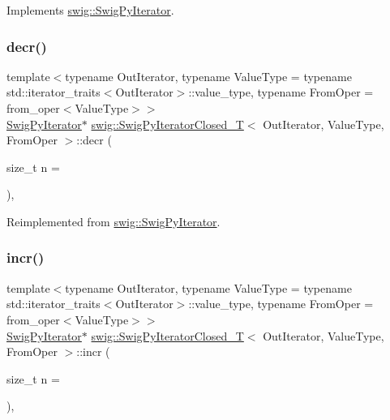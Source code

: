 Implements \hyperlink{structswig_1_1_swig_py_iterator_ae74c4b06f59975d9df19b30780cdefc1}{swig\+::\+Swig\+Py\+Iterator}.

\mbox{\label{classswig_1_1_swig_py_iterator_closed___t_aafae78acb63a1c4acaf2a76d4e9f6267}} 
\subsubsection{\texorpdfstring{decr()}{decr()}}
{\footnotesize\ttfamily template$<$typename Out\+Iterator, typename Value\+Type = typename std\+::iterator\+\_\+traits$<$\+Out\+Iterator$>$\+::value\+\_\+type, typename From\+Oper = from\+\_\+oper$<$\+Value\+Type$>$$>$ \\
\hyperlink{structswig_1_1_swig_py_iterator}{Swig\+Py\+Iterator}$\ast$ \hyperlink{classswig_1_1_swig_py_iterator_closed___t}{swig\+::\+Swig\+Py\+Iterator\+Closed\+\_\+T}$<$ Out\+Iterator, Value\+Type, From\+Oper $>$\+::decr (\begin{DoxyParamCaption}\item[{size\+\_\+t}]{n = {} }\end{DoxyParamCaption})\hspace{0.3cm}{\ttfamily [inline]}, {\ttfamily [virtual]}}



Reimplemented from \hyperlink{structswig_1_1_swig_py_iterator_aad0c74a8c95526184fefb897476320ef}{swig\+::\+Swig\+Py\+Iterator}.

\mbox{\label{classswig_1_1_swig_py_iterator_closed___t_a1bf667d0f643064b452ecb2fc5e48df2}} 
\subsubsection{\texorpdfstring{incr()}{incr()}}
{\footnotesize\ttfamily template$<$typename Out\+Iterator, typename Value\+Type = typename std\+::iterator\+\_\+traits$<$\+Out\+Iterator$>$\+::value\+\_\+type, typename From\+Oper = from\+\_\+oper$<$\+Value\+Type$>$$>$ \\
\hyperlink{structswig_1_1_swig_py_iterator}{Swig\+Py\+Iterator}$\ast$ \hyperlink{classswig_1_1_swig_py_iterator_closed___t}{swig\+::\+Swig\+Py\+Iterator\+Closed\+\_\+T}$<$ Out\+Iterator, Value\+Type, From\+Oper $>$\+::incr (\begin{DoxyParamCaption}\item[{size\+\_\+t}]{n = {} }\end{DoxyParamCaption})\hspace{0.3cm}{\ttfamily [inline]}, {\ttfamily [virtual]}}



